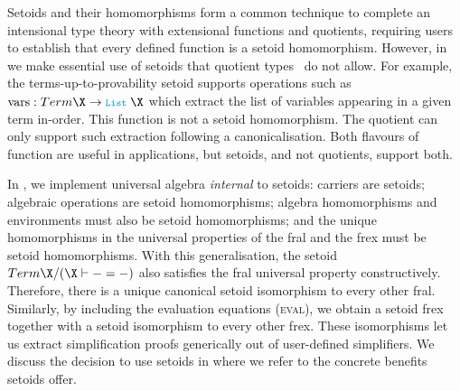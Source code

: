 Setoids and their homomorphisms form a common technique to complete an
intensional type theory with extensional functions and quotients,
requiring users to establish that every defined function is a setoid
homomorphism.  However, in \Frexlib{} we make essential use of setoids
that quotient types~\cite{hofmann-phd} do not allow.
%
For example, the terms-up-to-provability
setoid supports operations such as $\mathrm{vars} : \Term\X
\to \List\;\X$ which extract the list of variables appearing in a given
term in-order. This function is not a setoid homomorphism.
The quotient can only support such extraction following a canonicalisation.
Both flavours of
function are useful in applications, but setoids, and not quotients,
support both.

In \Frexlib{}, we implement universal algebra \emph{internal} to setoids:
carriers are setoids; algebraic operations are setoid homomorphisms;
algebra homomorphisms and environments must also be setoid
homomorphisms; and the unique homomorphisms in the universal
properties of the fral and the frex must be setoid homomorphisms.
With this generalisation, the setoid $\Term\X/(\X\vdash-=-)$ also
satisfies the fral universal property constructively. Therefore, there
is a unique canonical setoid isomorphism to every other fral.  Similarly,
by including the evaluation equations (\textsc{eval}), we obtain a
setoid frex together with a setoid isomorphism to every other frex.
These
isomorphisms let us extract simplification proofs generically out of
user-defined simplifiers. We discuss the decision to use setoids
in  where we refer to the concrete benefits setoids offer.
